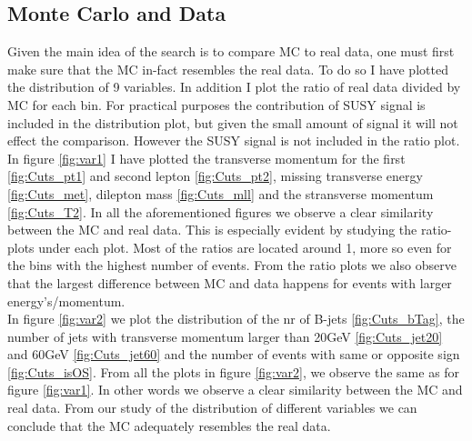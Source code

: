 \documentclass{article}
\begin{document}
\subsection{Monte Carlo and Data}\label{subsec:MCandData}
Given the main idea of the search is to compare MC to real data, one must first make sure that the MC in-fact resembles the real data. To do so I have plotted the distribution of 9 variables. In addition I plot the ratio of real data divided by MC for each bin. For practical purposes the contribution of SUSY signal is included in the distribution plot, but given the small amount of signal it will not effect the comparison. However the SUSY signal is not included in the ratio plot.
\\
In figure \ref{fig:var1} I have plotted the transverse momentum for the first \ref{fig:Cuts_pt1} and second lepton \ref{fig:Cuts_pt2}, missing transverse energy \ref{fig:Cuts_met}, dilepton mass \ref{fig:Cuts_mll} and the stransverse momentum \ref{fig:Cuts_T2}. In all the aforementioned figures we observe a clear similarity between the MC and real data. This is especially evident by studying the ratio-plots under each plot. Most of the ratios are located around 1, more so even for the bins with the highest number of events. From the ratio plots we also observe that the largest difference between MC and data happens for events with larger energy's/momentum.  
\\
In figure \ref{fig:var2} we plot the distribution of the nr of B-jets \ref{fig:Cuts_bTag}, the number of jets with transverse momentum larger than 20GeV \ref{fig:Cuts_jet20}
and 60GeV \ref{fig:Cuts_jet60} and the number of events with same or opposite sign \ref{fig:Cuts_isOS}. From all the plots in figure \ref{fig:var2}, we observe the same as for figure \ref{fig:var1}. In other words we observe a clear similarity between the MC and real data. From our study of the distribution of different variables we can conclude that the MC adequately resembles the real data.
\end{document}
